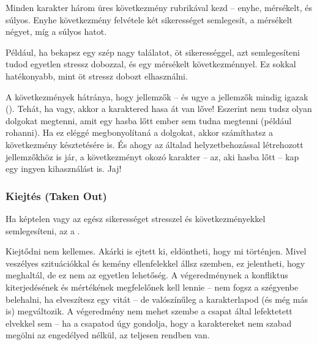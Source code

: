 Minden karakter három üres következmény rubrikával kezd -- enyhe, mérsékelt, és súlyos. Enyhe következmény felvétele két sikerességet semlegesít, a mérsékelt négyet, míg a súlyos hatot.

Például, ha bekapsz egy szép nagy találatot, öt sikerességgel, azt semlegesíteni tudod egyetlen stressz dobozzal, és egy mérsékelt következménnyel. Ez sokkal hatékonyabb, mint öt stressz dobozt elhasználni.

\newpage

A következmények hátránya, hogy jellemzők -- és ugye a jellemzők mindig igazak (). Tehát, ha  vagy, akkor a karaktered hasa át van lőve! Eszerint nem tudsz olyan dolgokat megtenni, amit egy hasba lőtt ember sem tudna megtenni (például rohanni). Ha ez eléggé megbonyolítaná a dolgokat, akkor számíthatsz a következmény késztetésére is. És ahogy az általad helyzetbehozással létrehozott jellemzőkhöz is jár, a következményt okozó karakter -- az, aki hasba lőtt -- kap egy ingyen kihasználást is. Jaj!


\subsubsection[Kiejtés]{Kiejtés (Taken Out)}

Ha képtelen vagy az egész sikerességet stresszel és következményekkel semlegesíteni, az a .

Kiejtődni nem kellemes. Akárki is ejtett ki, eldöntheti, hogy mi történjen. Mivel veszélyes szituációkkal és kemény ellenfelekkel állsz szemben, ez jelentheti, hogy meghaltál, de ez nem az egyetlen lehetőség. A végeredménynek a konfliktus kiterjedésének és mértékének megfelelőnek kell lennie -- nem fogsz a szégyenbe belehalni, ha elveszítesz egy vitát -- de valószínűleg a karakterlapod (és még más is) megváltozik. A végeredmény nem mehet szembe a csapat által lefektetett elvekkel sem -- ha a csapatod úgy gondolja, hogy a karaktereket nem szabad megölni az engedélyed nélkül, az teljesen rendben van.

